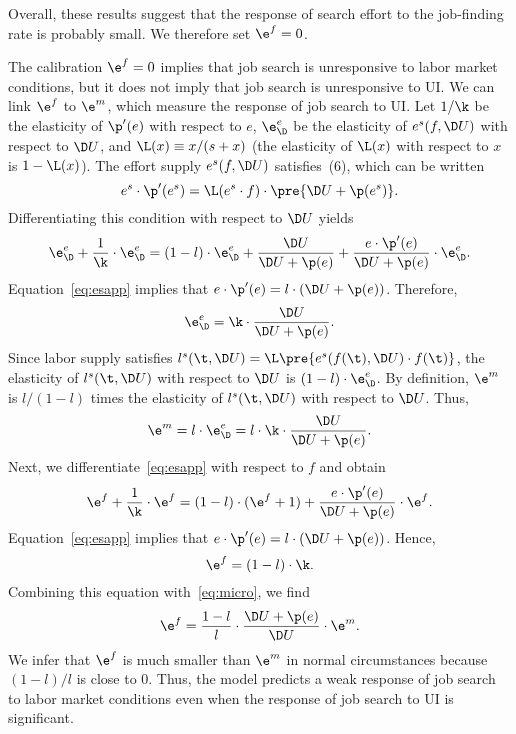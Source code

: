 \documentclass[letterpaper,12pt,leqno]{article}
\begin{document}
Overall, these results suggest that the response of search effort to the job-finding rate is probably small. We therefore set $\e^{f}=0$.

The calibration $\e^{f}=0$ implies that job search is unresponsive to labor market conditions, but it does not imply that job search is unresponsive to UI. We can link $\e^{f}$ to $\e^{m}$, which measure the response of job search to UI. Let $1/\k$ be the elasticity of $\p'(e)$ with respect to $e$, $\e^{e}_{\D}$ be the elasticity of $e^{s}(f,\D U)$ with respect to $\D U$, and $\L(x)\equiv x/(s+x)$ (the elasticity of $\L(x)$ with respect to $x$ is $1-\L(x)$). The effort supply $e^{s}(f,\D U)$ satisfies~(6), which can be written
\begin{equation}
e^{s}\cdot \p'(e^{s})=\L(e^{s}\cdot f) \cdot \pre{\D U + \p(e^{s})}.
\label{eq:esapp}\end{equation}
Differentiating this condition with respect to $\D U$ yields
\begin{equation*}
\e^{e}_{\D}+\frac{1}{\k}\cdot \e^{e}_{\D}=(1-l)\cdot \e^{e}_{\D}+\frac{\D U}{\D U+\p(e)}+ \frac{e\cdot \p'(e)}{\D U+\p(e)}\cdot\e^{e}_{\D}.
\end{equation*}
Equation~\eqref{eq:esapp} implies that $e\cdot \p'(e)=l\cdot (\D U+\p(e))$. Therefore,  
\begin{equation*}
\e^{e}_{\D}=\k\cdot \frac{\D U}{\D U+\p(e)}.
\end{equation*}
Since labor supply satisfies $l^{s}(\t,\D U)=\L\pre{e^{s}(f(\t),\D U)\cdot f(\t)}$, the elasticity of $l^{s}(\t,\D U)$ with respect to $\D U$ is $(1-l)\cdot \e^{e}_{\D}$. By definition, $\e^{m}$ is $l/(1-l)$ times the elasticity of $l^{s}(\t,\D U)$ with respect to $\D U$. Thus,
\begin{equation}
\e^{m}=l\cdot \e^{e}_{\D}=l\cdot \k \cdot \frac{\D U}{\D U+\p(e)}.
\label{eq:micro}\end{equation}
Next, we differentiate~\eqref{eq:esapp} with respect to $f$ and obtain
\begin{equation*}
\e^{f}+\frac{1}{\k}\cdot \e^{f}=(1-l)\cdot (\e^{f}+1)+\frac{e\cdot \p'(e)}{\D U+\p(e)} \cdot \e^{f}.
\end{equation*}
Equation~\eqref{eq:esapp} implies that $e\cdot \p'(e)=l\cdot (\D U+\p(e))$. Hence, 
\begin{equation*}
\e^{f}=(1-l)\cdot \k.
\end{equation*}
Combining this equation with~\eqref{eq:micro}, we find
\begin{equation*}
\e^{f}= \frac{1-l}{l}\cdot \frac{\D U+\p(e)}{\D U}\cdot \e^{m}.
\end{equation*}
We infer that $\e^{f}$ is much smaller than $\e^{m}$ in normal circumstances because $(1-l)/l$ is close to 0. Thus, the model predicts a weak response of job search to labor market conditions even when the response of job search to UI is significant.
\end{document}
